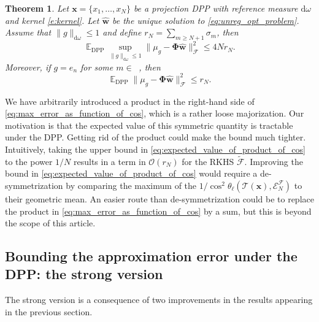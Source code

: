 \documentclass[twoside,11pt]{book}
\newtheorem{theorem}{Theorem}
\numberwithin{theorem}{chapter}
\numberwithin{definition}{chapter}
\numberwithin{proposition}{chapter}
\numberwithin{corollary}{chapter}
\numberwithin{example}{chapter}
\numberwithin{lemma}{chapter}
\numberwithin{assumption}{chapter}
\DeclareMathOperator{\DPP}{\mathrm{DPP}}
\DeclareMathOperator{\EX}{\mathbb{E}}
\DeclareMathOperator{\Ns}{\mathbb{N}^{*}}
\begin{document}
\begin{theorem}\label{thm:main_theorem_refined}
Let $\bm{x} = \{x_{1}, \dots , x_{N}\}$ be a projection DPP with reference measure $\mathrm{d}\omega$ and kernel \eqref{e:kernel}. Let $\hat{\bm{w}}$ be the unique solution to \eqref{eq:unreg_opt_problem}. Assume that $\|g\|_{\mathrm{d}\omega} \leq 1$ and define $r_{N} = \sum\limits_{m \geq N+1} \sigma_{m}$, then
\begin{equation}\label{eq:main_result_refined}
\EX_{\DPP} \sup\limits_{\|g\|_{\mathrm{d}\omega} \leq 1}\|\mu_{g} - \bm{\Phi}\hat{\bm{w}}\|_{\mathcal{F}}^{2}  \leq 4 Nr_{N}.
\end{equation}
Moreover, if $g = e_{n}$ for some $m \in \Ns$, then
\begin{equation}\label{eq:main_result_refined_eigfunction}
\EX_{\DPP} \|\mu_{g} - \bm{\Phi}\hat{\bm{w}}\|_{\mathcal{F}}^{2}  \leq r_{N}.
\end{equation}
\end{theorem}



We have arbitrarily introduced a product in the right-hand side of \eqref{eq:max_error_as_function_of_cos}, which is a rather loose majorization. Our motivation is that the expected value of this symmetric quantity is tractable under the DPP. Getting rid of the product could make the bound much tighter. Intuitively, taking the upper bound in \eqref{eq:expected_value_of_product_of_cos} to the power $1/N$ results in a term in $\mathcal{O}(r_{N})$ for the RKHS $\tilde{\mathcal{F}}$. Improving the bound in \eqref{eq:expected_value_of_product_of_cos} would require a de-symmetrization by comparing the maximum of the $1/\cos^{2} \theta_{\ell}(\mathcal{T}(\bm{x}),\mathcal{E}^{\mathcal{F}}_{N})$ to their geometric mean.
An easier route than de-symmetrization could be to replace the product in \eqref{eq:max_error_as_function_of_cos} by a sum, but this is beyond the scope of this article.


\subsection{Bounding the approximation error under the DPP: the strong version}
The strong version is a consequence of two improvements in the results appearing in the previous section.
\end{document}
